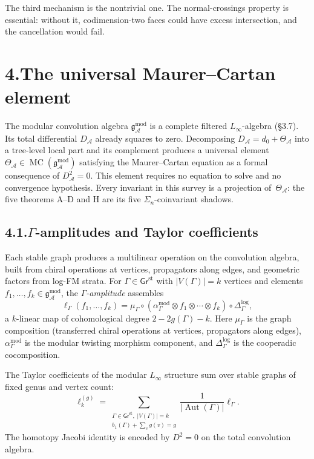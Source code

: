 \documentclass[11pt,reqno]{amsart}
\theoremstyle{definition}
\theoremstyle{remark}
\providecommand{\cA}{\mathcal{A}}
\providecommand{\gAmod}{\mathfrak{g}^{\mathrm{mod}}_\cA}
\numberwithin{equation}{section}
\begin{document}
The third mechanism is the nontrivial one. The normal-crossings
property is essential: without it, codimension-two faces could have
excess intersection, and the cancellation would fail.


\section*{4.\quad The universal Maurer--Cartan element}

The modular convolution algebra $\gAmod$ is a complete filtered
$L_\infty$-algebra (\S3.7). Its total differential
$D_\cA$ already squares to zero. Decomposing $D_\cA=d_0+\Theta_\cA$
into a tree-level local part and its complement produces a universal
element $\Theta_\cA\in\operatorname{MC}(\gAmod)$ satisfying the
Maurer--Cartan equation as a formal consequence of $D_\cA^2=0$. This
element requires no equation to solve and no convergence hypothesis.
Every invariant in this survey is a projection of~$\Theta_\cA$: the
five theorems A--D and H are its five $\Sigma_n$-coinvariant shadows.

\subsection*{4.1.\enspace $\Gamma$-amplitudes and Taylor coefficients}

Each stable graph produces a multilinear operation on the convolution
algebra, built from chiral operations at vertices, propagators along
edges, and geometric factors from log-FM strata. For
$\Gamma\in\mathsf{Gr}^{\mathrm{st}}$ with $|V(\Gamma)|=k$ vertices and
elements $f_1,\ldots,f_k\in\gAmod$, the \emph{$\Gamma$-amplitude}
assembles
\[
\ell_\Gamma(f_1,\ldots,f_k)=\mu_\Gamma\circ(\alpha^{\mathrm{mod}}_\Gamma\otimes f_1\otimes\cdots\otimes f_k)\circ\Delta^{\log}_\Gamma,
\]
a $k$-linear map of cohomological degree $2-2g(\Gamma)-k$. Here
$\mu_\Gamma$ is the graph composition (transferred chiral operations
at vertices, propagators along edges), $\alpha^{\mathrm{mod}}_\Gamma$
is the modular twisting morphism component, and $\Delta^{\log}_\Gamma$
is the cooperadic cocomposition.

The Taylor coefficients of the modular $L_\infty$ structure sum over
stable graphs of fixed genus and vertex count:
\[
\ell_k^{(g)}=\sum_{\substack{\Gamma\in\mathsf{Gr}^{\mathrm{st}},\;|V(\Gamma)|=k\\b_1(\Gamma)+\sum_v g(v)=g}}\frac{1}{|\operatorname{Aut}(\Gamma)|}\ell_\Gamma.
\]
The homotopy Jacobi identity is encoded by $D^2=0$ on the total
convolution algebra.
\end{document}
